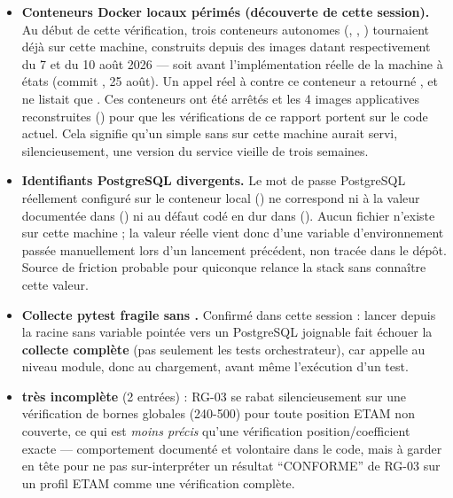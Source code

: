 \documentclass[11pt,a4paper]{article}
\begin{document}
\begin{itemize}[leftmargin=1.3em]

\item \textbf{Conteneurs Docker locaux p\'erim\'es (d\'ecouverte de cette session).} Au d\'ebut de cette v\'erification, trois conteneurs autonomes (, , ) tournaient d\'ej\`a sur cette machine, construits depuis des images datant respectivement du 7 et du 10 ao\^ut 2026 --- soit avant l'impl\'ementation r\'eelle de la machine \`a \'etats (commit , 25 ao\^ut). Un appel r\'eel \`a  contre ce conteneur a retourn\'e , et  ne listait que . Ces conteneurs ont \'et\'e arr\^et\'es et les 4 images applicatives reconstruites () pour que les v\'erifications de ce rapport portent sur le code actuel. Cela signifie qu'un simple  sans  sur cette machine aurait servi, silencieusement, une version du service vieille de trois semaines.
\item \textbf{Identifiants PostgreSQL divergents.} Le mot de passe PostgreSQL r\'eellement configur\'e sur le conteneur local () ne correspond ni \`a la valeur document\'ee dans  () ni au d\'efaut cod\'e en dur dans  (). Aucun fichier  n'existe sur cette machine ; la valeur r\'eelle vient donc d'une variable d'environnement pass\'ee manuellement lors d'un lancement pr\'ec\'edent, non trac\'ee dans le d\'ep\^ot. Source de friction probable pour quiconque relance la stack sans conna\^itre cette valeur.
\item \textbf{Collecte pytest fragile sans .} Confirm\'e dans cette session : lancer  depuis la racine sans variable  point\'ee vers un PostgreSQL joignable fait \'echouer la \textbf{collecte compl\`ete} (pas seulement les tests orchestrateur), car  appelle  au niveau module, donc au chargement, avant m\^eme l'ex\'ecution d'un test.
\item \textbf{ tr\`es incompl\`ete} (2 entr\'ees) : RG-03 se rabat silencieusement sur une v\'erification de bornes globales (240-500) pour toute position ETAM non couverte, ce qui est \emph{moins pr\'ecis} qu'une v\'erification position/coefficient exacte --- comportement document\'e et volontaire dans le code, mais \`a garder en t\^ete pour ne pas sur-interpr\'eter un r\'esultat ``CONFORME'' de RG-03 sur un profil ETAM comme une v\'erification compl\`ete.

\end{itemize}
\end{document}
